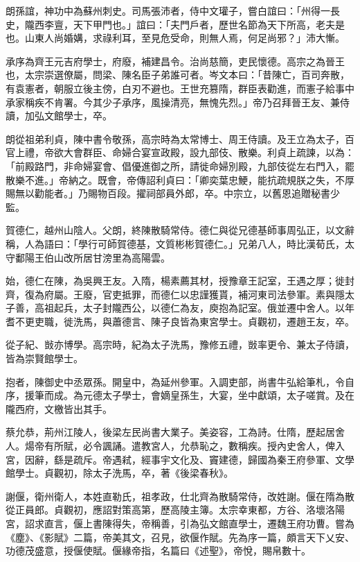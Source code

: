 \begin{pinyinscope}
 朗孫誼，神功中為蘇州刺史。司馬張沛者，侍中文瓘子，嘗白誼曰：「州得一長史，隴西李亶，天下甲門也。」誼曰：「夫門戶者，歷世名節為天下所高，老夫是也。山東人尚婚媾，求祿利耳，至見危受命，則無人焉，何足尚邪？」沛大慚。



 承序為齊王元吉府學士，府廢，補建昌令。治尚慈簡，吏民懷德。高宗之為晉王也，太宗崇選僚屬，問梁、陳名臣子弟誰可者。岑文本曰：「昔陳亡，百司奔散，有袁憲者，朝服立後主傍，白刃不避也。王世充篡隋，群臣表勸進，而憲子給事中承家稱疾不肯署。今其少子承序，風操清亮，無愧先烈。」帝乃召拜晉王友、兼侍讀，加弘文館學士，卒。



 朗從祖弟利貞，陳中書令敬孫，高宗時為太常博士、周王侍讀。及王立為太子，百官上禮，帝欲大會群臣、命婦合宴宣政殿，設九部伎、散樂。利貞上疏諫，以為：「前殿路門，非命婦宴會、倡優進御之所，請徙命婦別殿，九部伎從左右門入，罷散樂不進。」帝納之。既會，帝傳詔利貞曰：「卿奕葉忠鯁，能抗疏規朕之失，不厚賜無以勸能者。」乃賜物百段。擢祠部員外郎，卒。中宗立，以舊恩追贈秘書少監。



 賀德仁，越州山陰人。父朗，終陳散騎常侍。德仁與從兄德基師事周弘正，以文辭稱，人為語曰：「學行可師賀德基，文質彬彬賀德仁。」兄弟八人，時比漢荀氏，太守鄱陽王伯山改所居甘滂里為高陽雲。



 始，德仁在陳，為吳興王友。入隋，楊素薦其材，授豫章王記室，王遇之厚；徙封齊，復為府屬。王廢，官吏抵罪，而德仁以忠謹獲貰，補河東司法參軍。素與隱太子善，高祖起兵，太子封隴西公，以德仁為友，庾抱為記室。俄並遷中舍人。以年耆不更吏職，徙洗馬，與蕭德言、陳子良皆為東宮學士。貞觀初，遷趙王友，卒。



 從子紀、敱亦博學。高宗時，紀為太子洗馬，豫修五禮，敱率更令、兼太子侍讀，皆為崇賢館學士。



 抱者，陳御史中丞眾孫。開皇中，為延州參軍。入調吏部，尚書牛弘給筆札，令自序，援筆而成。為元德太子學士，會嫡皇孫生，大宴，坐中獻頌，太子嗟賞。及在隴西府，文檄皆出其手。



 蔡允恭，荊州江陵人，後梁左民尚書大業子。美姿容，工為詩。仕隋，歷起居舍人。煬帝有所賦，必令諷誦。遣教宮人，允恭恥之，數稱疾。授內史舍人，俾入宮，因辭，繇是疏斥。帝遇弒，經事宇文化及、竇建德，歸國為秦王府參軍、文學館學士。貞觀初，除太子洗馬，卒，著《後梁春秋》。



 謝偃，衛州衛人，本姓直勒氏，祖孝政，仕北齊為散騎常侍，改姓謝。偃在隋為散從正員郎。貞觀初，應詔對策高第，歷高陵主簿。太宗幸東都，方谷、洛壞洛陽宮，詔求直言，偃上書陳得失，帝稱善，引為弘文館直學士，遷魏王府功曹。嘗為《塵》、《影賦》二篇，帝美其文，召見，欲偃作賦。先為序一篇，頗言天下乂安、功德茂盛意，授偃使賦。偃緣帝指，名篇曰《述聖》，帝悅，賜帛數十。




\end{pinyinscope}

